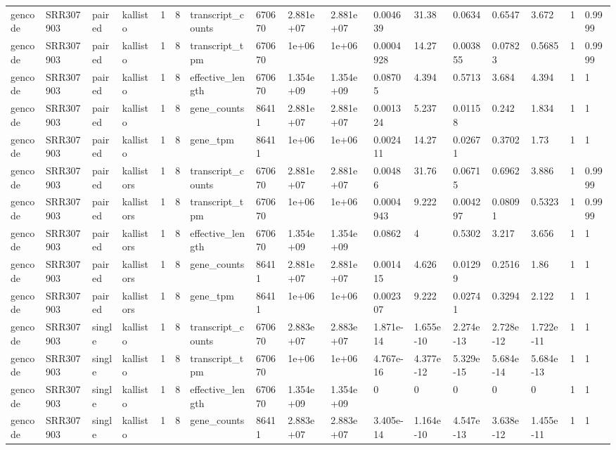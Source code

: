 \begin{tabular}{lllllllllllllllll}
gencode & SRR307903 & paired & kallisto & 1 & 8 & transcript\_counts & 670670 & 2.881e+07 & 2.881e+07 & 0.004639 & 31.38 & 0.0634 & 0.6547 & 3.672 & 1 & 0.9999 \\
gencode & SRR307903 & paired & kallisto & 1 & 8 & transcript\_tpm & 670670 & 1e+06 & 1e+06 & 0.0004928 & 14.27 & 0.003855 & 0.07823 & 0.5685 & 1 & 0.9999 \\
gencode & SRR307903 & paired & kallisto & 1 & 8 & effective\_length & 670670 & 1.354e+09 & 1.354e+09 & 0.08705 & 4.394 & 0.5713 & 3.684 & 4.394 & 1 & 1 \\
gencode & SRR307903 & paired & kallisto & 1 & 8 & gene\_counts & 86411 & 2.881e+07 & 2.881e+07 & 0.001324 & 5.237 & 0.01158 & 0.242 & 1.834 & 1 & 1 \\
gencode & SRR307903 & paired & kallisto & 1 & 8 & gene\_tpm & 86411 & 1e+06 & 1e+06 & 0.002411 & 14.27 & 0.02671 & 0.3702 & 1.73 & 1 & 1 \\
gencode & SRR307903 & paired & kallistors & 1 & 8 & transcript\_counts & 670670 & 2.881e+07 & 2.881e+07 & 0.00486 & 31.76 & 0.06715 & 0.6962 & 3.886 & 1 & 0.9999 \\
gencode & SRR307903 & paired & kallistors & 1 & 8 & transcript\_tpm & 670670 & 1e+06 & 1e+06 & 0.0004943 & 9.222 & 0.004297 & 0.08091 & 0.5323 & 1 & 0.9999 \\
gencode & SRR307903 & paired & kallistors & 1 & 8 & effective\_length & 670670 & 1.354e+09 & 1.354e+09 & 0.0862 & 4 & 0.5302 & 3.217 & 3.656 & 1 & 1 \\
gencode & SRR307903 & paired & kallistors & 1 & 8 & gene\_counts & 86411 & 2.881e+07 & 2.881e+07 & 0.001415 & 4.626 & 0.01299 & 0.2516 & 1.86 & 1 & 1 \\
gencode & SRR307903 & paired & kallistors & 1 & 8 & gene\_tpm & 86411 & 1e+06 & 1e+06 & 0.002307 & 9.222 & 0.02741 & 0.3294 & 2.122 & 1 & 1 \\
gencode & SRR307903 & single & kallisto & 1 & 8 & transcript\_counts & 670670 & 2.883e+07 & 2.883e+07 & 1.871e-14 & 1.655e-10 & 2.274e-13 & 2.728e-12 & 1.722e-11 & 1 & 1 \\
gencode & SRR307903 & single & kallisto & 1 & 8 & transcript\_tpm & 670670 & 1e+06 & 1e+06 & 4.767e-16 & 4.377e-12 & 5.329e-15 & 5.684e-14 & 5.684e-13 & 1 & 1 \\
gencode & SRR307903 & single & kallisto & 1 & 8 & effective\_length & 670670 & 1.354e+09 & 1.354e+09 & 0 & 0 & 0 & 0 & 0 & 1 & 1 \\
gencode & SRR307903 & single & kallisto & 1 & 8 & gene\_counts & 86411 & 2.883e+07 & 2.883e+07 & 3.405e-14 & 1.164e-10 & 4.547e-13 & 3.638e-12 & 1.455e-11 & 1 & 1 \\

\end{tabular}

